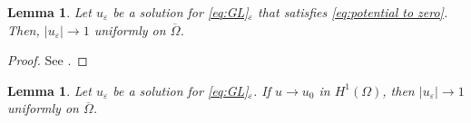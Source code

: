 \documentclass[a4paper,10pt,reqno]{amsart}
\newtheorem{lemma}[theorem]{Lemma}
\theoremstyle{definition}
\newcommand{\ve}{{\varepsilon}}
\newcommand{\Om}{{\Omega}}
\numberwithin{equation}{section}
\begin{document}
\smallskip
\begin{lemma}\label{lem:pot to zero implies unif conv}
Let  $u_\ve$ be a solution for  \eqref{eq:GL}$_\ve$ that satisfies \eqref{eq:potential to zero}.
Then, $|u_\ve| \to 1 $ uniformly on $\overline\Om $.
\end{lemma}
%
\begin{proof}
See \cite[Step A.1, B.2]{BBH93}.
\end{proof}



\smallskip
\begin{lemma}\label{lem:H1 conv implies unif conv}
Let  $u_\ve$ be a solution for  \eqref{eq:GL}$_\ve$.
If  $u\to u_0$ in $H^1(\Om)$, then $|u_\ve| \to 1 $ uniformly on $\overline\Om $.
\end{lemma}
%
\end{document}
